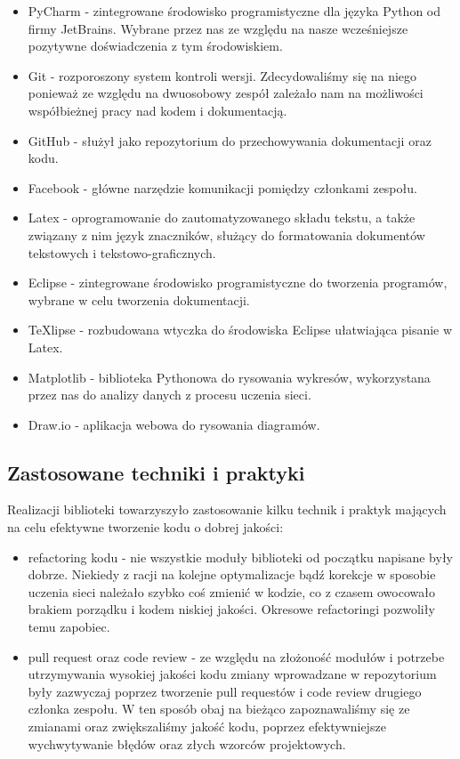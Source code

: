 \begin{itemize}
  \item PyCharm - zintegrowane środowisko programistyczne dla języka Python od firmy JetBrains.
  Wybrane przez nas ze względu na nasze wcześniejsze pozytywne doświadczenia z tym środowiskiem.
  \item Git - rozporoszony system kontroli wersji. Zdecydowaliśmy się na niego ponieważ ze względu na 
  dwuosobowy zespół zależało nam na możliwości współbieżnej pracy nad kodem i dokumentacją.
  \item GitHub - służył jako repozytorium do przechowywania dokumentacji oraz kodu.
  \item Facebook - główne narzędzie komunikacji pomiędzy członkami zespołu.
  \item Latex - oprogramowanie do zautomatyzowanego składu tekstu, a także związany z nim język 
  znaczników, służący do formatowania dokumentów tekstowych i tekstowo-graficznych. 
  \item Eclipse - zintegrowane środowisko programistyczne do tworzenia programów, wybrane w celu tworzenia 
  dokumentacji.
  \item TeXlipse - rozbudowana wtyczka do środowiska Eclipse ułatwiająca pisanie w Latex.  
  \item Matplotlib - biblioteka Pythonowa do rysowania wykresów, wykorzystana przez nas do analizy danych 
  z procesu uczenia sieci. 
  \item Draw.io - aplikacja webowa do rysowania diagramów.
\end{itemize}

\subsection{Zastosowane techniki i praktyki}
Realizacji biblioteki towarzyszyło zastosowanie kilku technik i praktyk mających na celu efektywne 
tworzenie kodu o dobrej jakości:
\begin{itemize}
  \item refactoring kodu - nie wszystkie moduły biblioteki od początku napisane były dobrze. Niekiedy z racji 
  na kolejne optymalizacje bądź korekcje w sposobie uczenia sieci należało szybko coś zmienić w kodzie,
  co z czasem owocowało brakiem porządku i kodem niskiej jakości. Okresowe refactoringi pozwoliły temu zapobiec.
  \item pull request oraz code review - ze względu na złożoność modułów i potrzebe utrzymywania wysokiej
  jakości kodu zmiany wprowadzane w repozytorium były zazwyczaj poprzez tworzenie pull requestów i code review
  drugiego członka zespołu. W ten sposób obaj na bieżąco zapoznawaliśmy się ze zmianami oraz zwiększaliśmy
  jakość kodu, poprzez efektywniejsze wychwytywanie błędów oraz złych wzorców projektowych.
\end{itemize}

